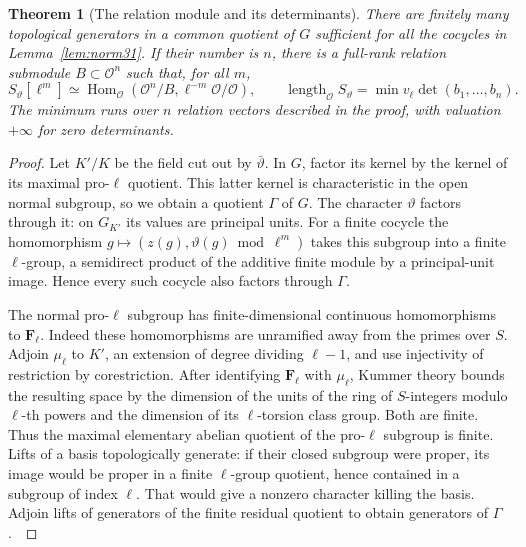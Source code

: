 \documentclass[a4paper,11pt]{article}
\newtheorem{theorem}[proposition]{Theorem}
\theoremstyle{definition}
\theoremstyle{remark}
\newcommand{\len}{\operatorname{length}}\newcommand{\Res}{\operatorname*{Res}}
\numberwithin{equation}{section}
\newcommand{\OO}{\mathcal O}
\begin{document}
\begin{theorem}[The relation module and its determinants]\label{thm:present31}
There are finitely many topological generators in a common quotient of \(G\) sufficient for all the cocycles in Lemma~\ref{lem:norm31}. If their number is \(n\), there is a full-rank relation submodule \(B\subset\OO^n\) such that, for all \(m\),
\[
    S_\vartheta[\ell^m]\simeq\operatorname{Hom}_{\OO}
                (\OO^n/B,\ell^{-m}\OO/\OO),\qquad
    \len_{\OO}S_\vartheta=\min v_\ell\det(b_1,\ldots,b_n).
\]
The minimum runs over \(n\) relation vectors described in the proof, with valuation \(+\infty\) for zero determinants.
\end{theorem}
\begin{proof}
Let \(K'/K\) be the field cut out by \(\bar\vartheta\). In \(G\), factor its kernel by the kernel of its maximal pro-\(\ell\) quotient. This latter kernel is characteristic in the open normal subgroup, so we obtain a quotient \(\Gamma\) of \(G\). The character \(\vartheta\) factors through it: on \(G_{K'}\) its values are principal units. For a finite cocycle the homomorphism \(g\mapsto(z(g),\vartheta(g)\bmod\ell^m)\) takes this subgroup into a finite \(\ell\)-group, a semidirect product of the additive finite module by a principal-unit image. Hence every such cocycle also factors through \(\Gamma\).

The normal pro-\(\ell\) subgroup has finite-dimensional continuous homomorphisms to \(\mathbf F_\ell\). Indeed these homomorphisms are unramified away from the primes over \(S\). Adjoin \(\mu_\ell\) to \(K'\), an extension of degree dividing \(\ell-1\), and use injectivity of restriction by corestriction. After identifying \(\mathbf F_\ell\) with \(\mu_\ell\), Kummer theory bounds the resulting space by the dimension of the units of the ring of \(S\)-integers modulo \(\ell\)-th powers and the dimension of its \(\ell\)-torsion class group. Both are finite. Thus the maximal elementary abelian quotient of the pro-\(\ell\) subgroup is finite. Lifts of a basis topologically generate: if their closed subgroup were proper, its image would be proper in a finite \(\ell\)-group quotient, hence contained in a subgroup of index \(\ell\). That would give a nonzero character killing the basis. Adjoin lifts of generators of the finite residual quotient to obtain generators of \(\Gamma\).~\cite[Ch.~4]{VI-IV-VI-wilkes}


\end{proof}
\end{document}
